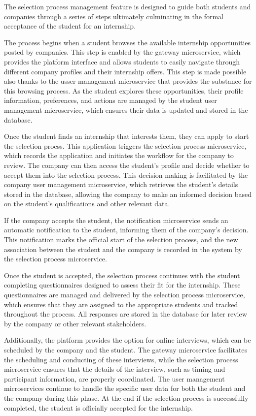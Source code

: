 The selection process management feature is designed to guide both students and companies through
a series of steps ultimately culminating in the formal acceptance of the student for an internship.

The process begins when a student browses the available internship opportunities posted
by companies. This step is enabled by the gateway microservice, which provides the platform
interface and allows students to easily navigate through different company profiles and their
internship offers.
This step is made
possible also thanks to the usser management microservice that provides the
substance for this browsing process.
As the student explores these opportunities, their profile information,
preferences, and actions are managed by the student user management microservice, which ensures
their data is updated and stored in the database.

Once the student finds an internship that interests them, they can apply to start the selection
proess. This application triggers the selection process microservice, which records the
application and initiates the workflow for the company to review. The company can then
access the student's profile and decide whether to accept them into the selection process.
This decision-making is facilitated by the company user management microservice, which retrieves
the student's details stored in the database, allowing the company to make an informed decision
based on the student's qualifications and other relevant data.

If the company accepts the student, the notification microservice sends an automatic notification
to the student, informing them of the company's decision. This notification marks the official
start of the selection process, and the new association between the student and the company is
recorded in the system by the selection process microservice.

Once the student is accepted, the selection process continues with the student completing
questionnaires designed to assess their fit for the internship. These questionnaires are
managed and delivered by the selection process microservice, which ensures that they are
assigned to the appropriate students and tracked throughout the process. All responses
are stored in the database for later review by the company or other relevant stakeholders.

Additionally, the platform provides the option for online interviews, which can be scheduled
by the company and the student. The gateway microservice facilitates the scheduling and
conducting of these interviews, while the selection process microservice ensures that the
details of the interview, such as timing and participant information, are properly coordinated.
The user management microservices continue to handle the specific user data for both the student
and the company during this phase.
At the end if the selection process is successfully completed, the student is officially
accepted for the internship.


